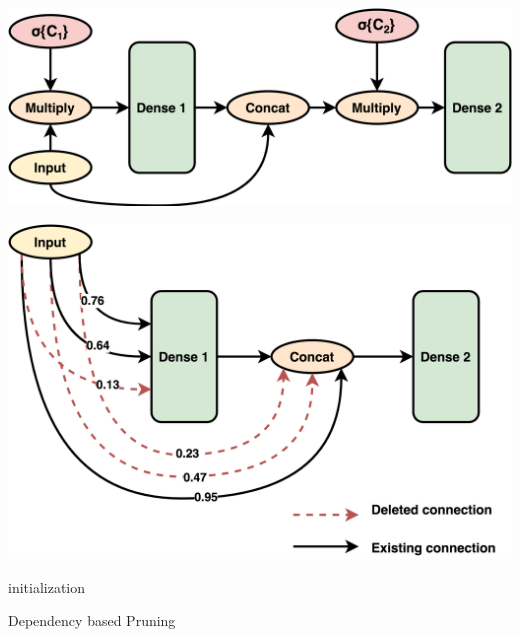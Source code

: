 \documentclass{article}
\begin{document}
\noindent\begin{minipage}{.5\textwidth}
   \centering
   \includegraphics[scale=0.1]{paper/Pruning1.png}
\end{minipage}
\begin{minipage}{.4\textwidth}
\centering
   \includegraphics[scale=0.09]{paper/Pruning2.png}
\end{minipage}



\noindent\begin{minipage}{.5\textwidth}
  \begin{algorithm}[H]
\SetAlgoLined
{}
 initialization\;
 \caption{Dependency based Pruning}
\end{algorithm}

\end{minipage}
\begin{minipage}{.4\textwidth}
\lipsum[6]
\end{minipage}
\end{document}
